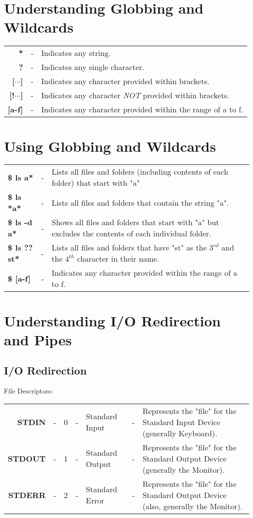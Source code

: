 \section{Understanding Globbing and Wildcards}
\begin{tabular}{rcl}
	\textbf{*} &- &Indicates any string. \\
	\textbf{?} &- &Indicates any single character. \\
	\textbf{[$\cdots$]} &- &Indicates any character provided within brackets. \\
	\textbf{[!$\cdots$]} &- &Indicates any character \textit{NOT} provided within brackets. \\
	\textbf{[a-f]} &- &Indicates any character provided within the range of a to f. \\
\end{tabular}

\section{Using Globbing and Wildcards}
\noindent
\begin{tabular}{lcp{}}
	\textbf{\$ ls a*} &- &Lists all files and folders (including contents of each folder) that start with "a" \\
	\textbf{\$ ls *a*} &- &Lists all files and folders that contain the string "a". \\
	\textbf{\$ ls -d a*} &- &Shows all files and folders that start with "a" but excludes the contents of each individual folder. \\
	\textbf{\$ ls ??st*} &- &Lists all files and folders that have "st" as the $3^{rd}$ and the $4^{th}$ character in their name. \\
	\textbf{\$ [a-f]} &- &Indicates any character provided within the range of a to f. \\
\end{tabular}

\section{Understanding I/O Redirection and Pipes}
\subsection{I/O Redirection}
File Descriptors:

\noindent
\begin{tabular}{rccclcp{}}
	\textbf{STDIN} &- &0 &- &Standard Input &- &Represents the "file" for the Standard Input Device (generally Keyboard). \\
	\textbf{STDOUT} &- &1 &- &Standard Output &- &Represents the "file" for the Standard Output Device (generally the Monitor). \\
	\textbf{STDERR} &- &2 &- &Standard Error &- &Represents the "file" for the Standard Output Device (also, generally the Monitor). \\
\end{tabular}

